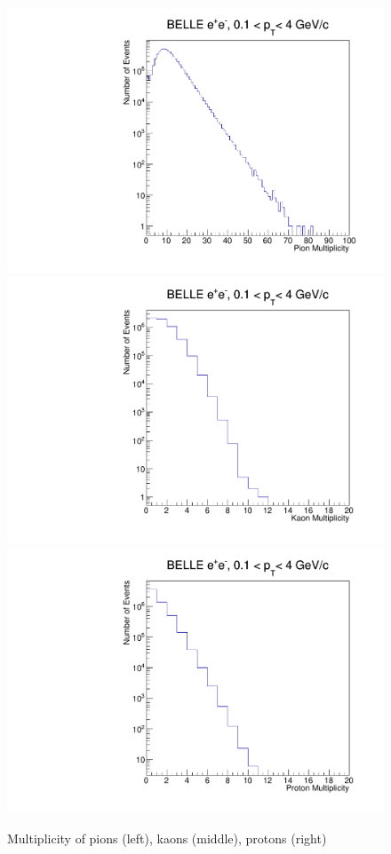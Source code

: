 \documentclass[%
preprint,
 amsmath,amssymb,
 aps,
]{revtex4-1}
\begin{document}
\begin{figure}[!htb]
\begin{center}
\includegraphics[width=.45\textwidth]{figures/pion_mult.pdf}
\includegraphics[width=.45\textwidth]{figures/kaon_mult.pdf}
\includegraphics[width=.45\textwidth]{figures/proton_mult.pdf}
\caption{Multiplicity of pions (left), kaons (middle), protons (right) }
\label{fig:ridgeBelle} 
\end{center}
\end{figure}
\end{document}

